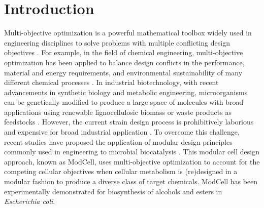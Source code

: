 \section{Introduction}
Multi-objective optimization is a powerful mathematical toolbox widely used in engineering disciplines to solve problems with multiple conflicting design objectives \cite{coello2004}.
For example, in the field of chemical engineering, multi-objective optimization has been applied to balance design conflicts in the performance, material and energy requirements, and environmental sustainability of many different chemical processes \cite{rangaiah2009}. In industrial biotechnology, with recent advancements in synthetic biology and metabolic engineering, microorganisms can be genetically modified to produce a large space of molecules with broad applications using renewable lignocellulosic biomass or waste products as feedstocks \cite{trinh2016, lee2019}.
However, the current strain design process is prohibitively laborious and expensive for broad industrial application \cite{nielsen2016}. To overcome this challenge, recent studies have proposed the application of modular design principles commonly used in engineering \cite{bonvoisin2016} to microbial biocatalysis \cite{trinh2012, trinh2015, garcia2019, garcia2019b}.
This modular cell design approach, known as ModCell, uses multi-objective optimization to account for the competing cellular objectives when cellular metabolism is (re)designed in a modular fashion to produce a diverse class of target chemicals. ModCell has been experimentally demonstrated for biosynthesis of alcohols \cite{trinh2011, trinh2012, wilbanks2017} and esters \cite{layton2014, layton2016, layton2016b, wierzbicki2016, lee2018} in \textit{Escherichia coli}.

